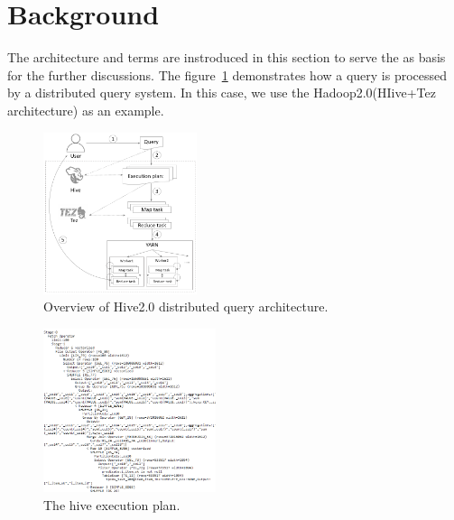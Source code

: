 \section{Background}
The architecture and terms are instroduced in this section to serve the as basis for the further discussions. 
The figure~\ref{fig:architecture} demonstrates how a query is processed by a distributed query system. In this case, we use the Hadoop2.0(HIive+Tez architecture) as an example.

\begin{figure}[t]
	\centering
	\includegraphics[width=0.40\textwidth]{figures/background/arc.png}
	\vspace{-3mm}
	\caption{Overview of Hive2.0 distributed query architecture.}
	\label{fig:architecture}
	\vspace{-3mm}
\end{figure}


\begin{figure}[t]
	\centering
	\includegraphics[width=0.45\textwidth]{figures/background/execution_plan.png}
	\vspace{-3mm}
	\caption{The hive execution plan.}
	\label{fig:exec_plan}
	\vspace{-3mm}
\end{figure}

